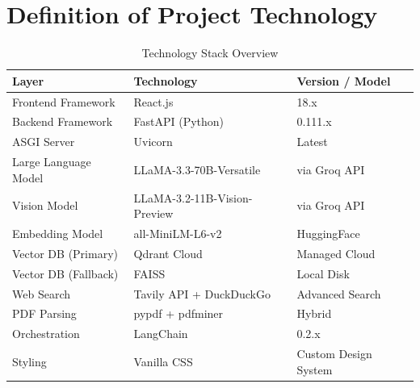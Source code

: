 \documentclass[12pt,a4paper]{report}
\begin{document}
\section{Definition of Project Technology}
\begin{table}[h]
\centering
\caption{Technology Stack Overview}
\label{tab:tech_stack}
\begin{tabular}{|l|l|l|}
\hline
\textbf{Layer} & \textbf{Technology} & \textbf{Version / Model} \\ \hline
Frontend Framework & React.js & 18.x \\ \hline
Backend Framework & FastAPI (Python) & 0.111.x \\ \hline
ASGI Server & Uvicorn & Latest \\ \hline
Large Language Model & LLaMA-3.3-70B-Versatile & via Groq API \\ \hline
Vision Model & LLaMA-3.2-11B-Vision-Preview & via Groq API \\ \hline
Embedding Model & all-MiniLM-L6-v2 & HuggingFace \\ \hline
Vector DB (Primary) & Qdrant Cloud & Managed Cloud \\ \hline
Vector DB (Fallback) & FAISS & Local Disk \\ \hline
Web Search & Tavily API + DuckDuckGo & Advanced Search \\ \hline
PDF Parsing & pypdf + pdfminer & Hybrid \\ \hline
Orchestration & LangChain & 0.2.x \\ \hline
Styling & Vanilla CSS & Custom Design System \\ \hline
\end{tabular}
\end{table}
\end{document}
